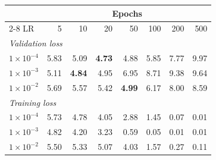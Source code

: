 \begin{tabular}{lrrrrrrr}
\toprule
& \multicolumn{7}{c}{Epochs} \\
\cmidrule(lr){2-8}
LR & 5 & 10 & 20 & 50 & 100 & 200 & 500 \\
\midrule
\multicolumn{8}{l}{\emph{Validation loss}} \\
$1\times10^{-4}$ & 5.83 & 5.09 & \textbf{4.73} & 4.88 & 5.85 & 7.77 & 9.97 \\
$1\times10^{-3}$ & 5.11 & \textbf{4.84} & 4.95 & 6.95 & 8.71 & 9.38 & 9.64 \\
$1\times10^{-2}$ & 5.69 & 5.57 & 5.42 & \textbf{4.99} & 6.17 & 8.00 & 8.59 \\
\midrule
\multicolumn{8}{l}{\emph{Training loss}} \\
$1\times10^{-4}$ & 5.73 & 4.78 & 4.05 & 2.88 & 1.45 & 0.07 & 0.01 \\
$1\times10^{-3}$ & 4.82 & 4.20 & 3.23 & 0.59 & 0.05 & 0.01 & 0.01 \\
$1\times10^{-2}$ & 5.50 & 5.33 & 5.07 & 4.03 & 1.57 & 0.27 & 0.11 \\
\bottomrule
\end{tabular}
